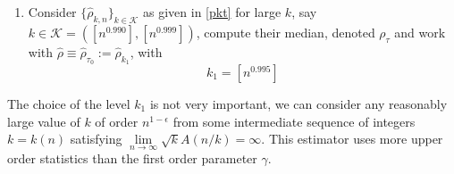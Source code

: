 \begin{subappendices}
\begin{enumerate}
			\item Consider $\{\hat{\rho}_{k,n}\}_{k\in \mathcal{K}}$ as given in \autoref{pkt} for large $k$, say $k\in \mathcal{K}=([n^{0.990}],[n^{0.999}])$, compute their median, denoted $\rho_\tau$ and work with $\hat{\rho}\equiv\hat{\rho}_{\tau_{0}}:=\hat{\rho}_{k_1}$, with\begin{equation}
			k_1=[n^{0.995}]
			\end{equation}
		\end{enumerate}
		The choice of the level $k_1$ is not very important, we can consider any reasonably large value of $k$ of order $n^{1-\epsilon}$ from some intermediate sequence of integers $k=k(n)$ satisfying $\lim\limits_{n\rightarrow\infty}\sqrt{k}A(n/k)=\infty$. This estimator uses more upper order statistics than the first order parameter $\gamma$.
\label{appendix1b}
\end{subappendices}